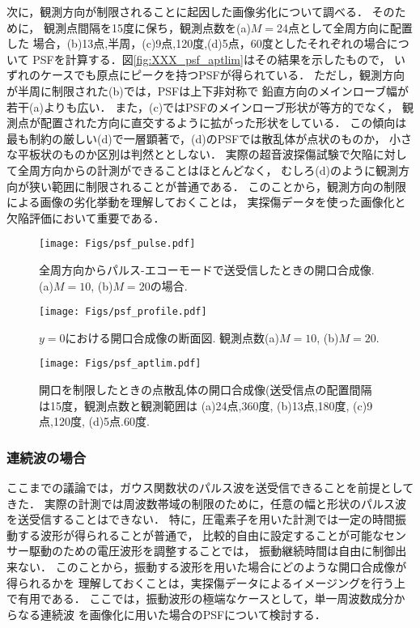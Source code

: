 次に，観測方向が制限されることに起因した画像劣化について調べる．
そのために， 観測点間隔を15度に保ち，観測点数を(a)$M=$24点として全周方向に配置した
場合，(b)13点,半周，(c)9点,120度,(d)5点，60度としたそれぞれの場合について
PSFを計算する．図\ref{fig:XXX_psf_aptlim}はその結果を示したもので，
いずれのケースでも原点にピークを持つPSFが得られている．
ただし，観測方向が半周に制限された(b)では，PSFは上下非対称で
鉛直方向のメインローブ幅が若干(a)よりも広い．
また，(c)ではPSFのメインローブ形状が等方的でなく，
観測点が配置された方向に直交するように拡がった形状をしている．
この傾向は最も制約の厳しい(d)で一層顕著で，(d)のPSFでは散乱体が点状のものか，
小さな平板状のものか区別は判然ととしない．
実際の超音波探傷試験で欠陥に対して全周方向からの計測ができることはほとんどなく，
むしろ(d)のように観測方向が狭い範囲に制限されることが普通である．
このことから，観測方向の制限による画像の劣化挙動を理解しておくことは，
実探傷データを使った画像化と欠陥評価において重要である．
\begin{figure}[h]
	\begin{center}
	\texttt{[image: Figs/psf\_pulse.pdf]} 
	\end{center}
	\caption{全周方向からパルス-エコーモードで送受信したときの開口合成像.(a)$M=10$, (b)$M=20$の場合.} 
	\label{fig:XXX_psf_pulse}
\end{figure}
\begin{figure}[h]
	\begin{center}
	\texttt{[image: Figs/psf\_profile.pdf]} 
	\end{center}
	\caption{$y=0$における開口合成像の断面図. 観測点数(a)$M=10$, (b)$M=20$.}
	\label{fig:XXX_psf_profile} 
\end{figure}
\begin{figure}[h]
	\begin{center}
	\texttt{[image: Figs/psf\_aptlim.pdf]} 
	\end{center}
	\caption{開口を制限したときの点散乱体の開口合成像(送受信点の配置間隔は15度，観測点数と観測範囲は
	(a)24点,360度, (b)13点,180度, (c)9点,120度, (d)5点.60度.} 
	\label{fig:XXX_100}
\end{figure}
\subsubsection{連続波の場合}
ここまでの議論では，ガウス関数状のパルス波を送受信できることを前提としてきた．
実際の計測では周波数帯域の制限のために，任意の幅と形状のパルス波を送受信することはできない．
特に，圧電素子を用いた計測では一定の時間振動する波形が得られることが普通で，
比較的自由に設定することが可能なセンサー駆動のための電圧波形を調整することでは，
振動継続時間は自由に制御出来ない．
このことから，振動する波形を用いた場合にどのような開口合成像が得られるかを
理解しておくことは，実探傷データによるイメージングを行う上で有用である．
ここでは，振動波形の極端なケースとして，単一周波数成分からなる連続波
を画像化に用いた場合のPSFについて検討する．\\

